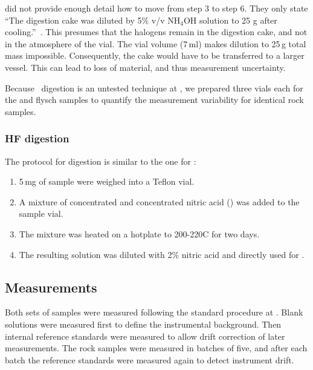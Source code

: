 \textcite{he_determination_2019} did not provide enough detail how to move from step 3 to step 6. 
They only state ``The digestion cake was diluted by 5\% v/v NH$_4$OH
solution to 25 g after cooling.''~\parencite[p. 8110]{he_determination_2019}.
This presumes that the halogens remain in the digestion cake, and not in the atmosphere of the vial.
The vial volume (7\,ml) makes dilution to 25\,g total mass impossible. 
Consequently, the cake would have to be transferred to a 
larger vessel. This can lead to loss of material, and thus measurement uncertainty.

Because \ambif\ digestion is an untested technique at \ETH, we prepared three vials each for the \OSM and flysch
samples to quantify the measurement variability for identical rock samples.


\subsubsection{HF digestion}

The protocol for  digestion is similar to the one for \ambif:

\begin{enumerate}
\item 5\,mg of sample were weighed into a Teflon vial.
\item A mixture of concentrated  and concentrated nitric acid () 
    was added to the sample vial.
\item The mixture was heated on a hotplate to 200-220\degree C for two days.
\item The resulting solution was diluted with 2\% nitric acid and directly used for \ICPMS.
\end{enumerate}

\subsection{Measurements}

Both sets of samples were measured following the standard procedure at \ETH.
Blank solutions were measured first to define the instrumental background.
Then internal reference standards were measured to allow drift correction of later measurements.
The rock samples were measured in batches of five, and after each batch
the reference standards were measured again to detect instrument drift. 


